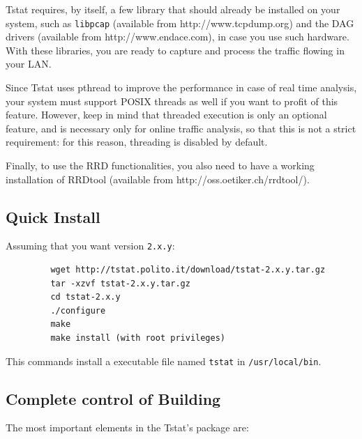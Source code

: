 \documentclass[11pt]{article}
\begin{document}
Tstat requires, by itself, a few library that should
already be installed on your system, such as 
\texttt{libpcap} (available from \textsf{http://www.tcpdump.org}) 
and the DAG drivers (available from \textsf{http://www.endace.com}), 
in case you use such hardware. With these libraries, 
you are ready to capture and process the traffic flowing
in your LAN.



Since Tstat uses pthread to improve the performance in case of real time
analysis, your system must support POSIX threads as well if you want to
profit of this feature. However, keep in mind that threaded execution 
is only an optional feature, and is necessary only for online traffic
analysis, so that this is not a strict requirement: for this reason,
threading is disabled by default.



Finally, to use the RRD functionalities, you also need to have a working
installation of RRDtool (available from \textsf{http://oss.oetiker.ch/rrdtool/}).

\subsection{Quick Install\label{Quick_Install}}


Assuming that you want version \texttt{2.x.y}:

\begin{small}\begin{verbatim}
         wget http://tstat.polito.it/download/tstat-2.x.y.tar.gz
         tar -xzvf tstat-2.x.y.tar.gz
         cd tstat-2.x.y
         ./configure
         make
         make install (with root privileges)
\end{verbatim}\end{small} \noindent
This commands install a executable file named \texttt{tstat} in \texttt{/usr/local/bin}.

\subsection{Complete control of Building\label{Complete_control_of_Building}}


The most important elements in the Tstat's package are:
\end{document}
